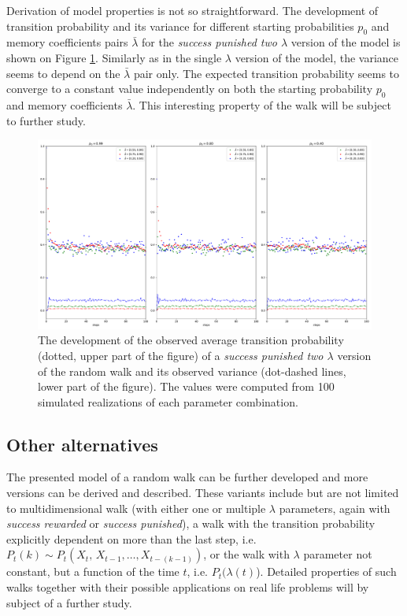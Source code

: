 \documentclass{amsart}
\theoremstyle{definition}
\theoremstyle{plain}
\theoremstyle{plain}
\numberwithin{equation}{section}
\begin{document}
Derivation of model properties is not so straightforward. The development
of transition probability and its variance for different starting
probabilities $p_{0}$ and memory coefficients pairs $\bar{\lambda}$
for the \emph{success punished two $\lambda$ }version of the model
is shown on Figure \ref{fig:Development-punish2l}. Similarly as in
the single $\lambda$ version of the model, the variance seems to
depend on the $\bar{\lambda}$ pair only. The expected transition
probability seems to converge to a constant value independently on
both the starting probability $p_{0}$ and memory coefficients $\bar{\lambda}$.
This interesting property of the walk will be subject to further study.

\begin{figure}
 \begin{center}
\includegraphics[width=1\textwidth]{../simulations/ept_100_walks_100_steps_type_success_punished_two_lambdas}
\caption{\label{fig:Development-punish2l}The development of the observed average
transition probability (dotted, upper part of the figure) of a \emph{success
punished two $\lambda$ }version of the random walk and its observed
variance (dot-dashed lines, lower part of the figure). The values
were computed from 100 simulated realizations of each parameter
combination.}
 \end{center}
\end{figure}


\subsection{Other alternatives}

The presented model of a random walk can be further developed and
more versions can be derived and described. These variants include
but are not limited to multidimensional walk (with either one or multiple
$\lambda$ parameters, again with \emph{success rewarded }or \emph{success
punished}), a walk with the transition probability explicitly dependent
on more than the last step, i.e. $P_{t}(k)\sim P_{t}(X_{t},\,X_{t-1},\dots,X_{t-(k-1)})$,
or the walk with $\lambda$ parameter not constant, but a function
of the time $t$, i.e. $P_{t}(\lambda(t)$). Detailed properties of
such walks together with their possible applications on real life
problems will by subject of a further study.
\end{document}
